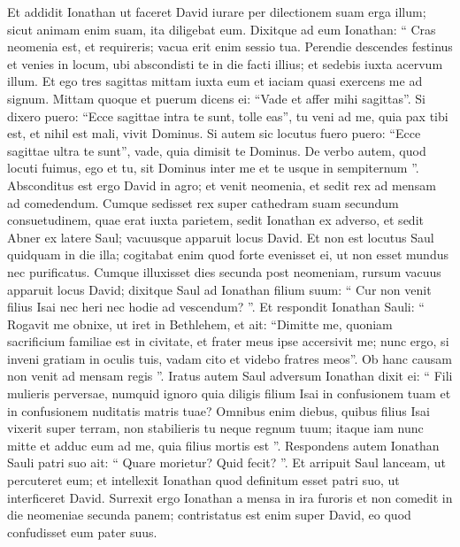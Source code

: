 \begin{biblechapter}
\begin{biblechapter}
\begin{biblechapter}
\begin{biblechapter}
\begin{biblechapter}
\begin{biblechapter}
\begin{biblechapter}
\begin{biblechapter}
\begin{biblechapter}
\begin{biblechapter}
\begin{biblechapter}
\begin{biblechapter}
\begin{biblechapter}
\begin{biblechapter}
\begin{biblechapter}
\begin{biblechapter}
\begin{biblechapter}
\begin{biblechapter}
\begin{biblechapter}
\begin{biblechapter}
\verse Et addidit Ionathan ut faceret David iurare per dilectionem suam erga illum; sicut animam enim suam, ita diligebat eum.
 \verse Dixitque ad eum Ionathan: “ Cras neomenia est, et requireris; 
\verse vacua erit enim sessio tua. Perendie descendes festinus et venies in locum, ubi abscondisti te in die facti illius; et sedebis iuxta acervum illum. 
\verse Et ego tres sagittas mittam iuxta eum et iaciam quasi exercens me ad signum. 
\verse Mittam quoque et puerum dicens ei: “Vade et affer mihi sagittas”. 
\verse Si dixero puero: “Ecce sagittae intra te sunt, tolle eas”, tu veni ad me, quia pax tibi est, et nihil est mali, vivit Dominus. Si autem sic locutus fuero puero: “Ecce sagittae ultra te sunt”, vade, quia dimisit te Dominus. 
\verse De verbo autem, quod locuti fuimus, ego et tu, sit Dominus inter me et te usque in sempiternum ”.
 \verse Absconditus est ergo David in agro; et venit neomenia, et sedit rex ad mensam ad comedendum. 
\verse Cumque sedisset rex super cathedram suam secundum consuetudinem, quae erat iuxta parietem, sedit Ionathan ex adverso, et sedit Abner ex latere Saul; vacuusque apparuit locus David. 
\verse Et non est locutus Saul quidquam in die illa; cogitabat enim quod forte evenisset ei, ut non esset mundus nec purificatus. 
\verse Cumque illuxisset dies secunda post neomeniam, rursum vacuus apparuit locus David; dixitque Saul ad Ionathan filium suum: “ Cur non venit filius Isai nec heri nec hodie ad vescendum? ”. 
\verse Et respondit Ionathan Sauli: “ Rogavit me obnixe, ut iret in Bethlehem, 
\verse et ait: “Dimitte me, quoniam sacrificium familiae est in civitate, et frater meus ipse accersivit me; nunc ergo, si inveni gratiam in oculis tuis, vadam cito et videbo fratres meos”. Ob hanc causam non venit ad mensam regis ”.
 \verse Iratus autem Saul adversum Ionathan dixit ei: “ Fili mulieris perversae, numquid ignoro quia diligis filium Isai in confusionem tuam et in confusionem nuditatis matris tuae? 
\verse Omnibus enim diebus, quibus filius Isai vixerit super terram, non stabilieris tu neque regnum tuum; itaque iam nunc mitte et adduc eum ad me, quia filius mortis est ”. 
\verse Respondens autem Ionathan Sauli patri suo ait: “ Quare morietur? Quid fecit? ”. 
\verse Et arripuit Saul lanceam, ut percuteret eum; et intellexit Ionathan quod definitum esset patri suo, ut interficeret David. 
\verse Surrexit ergo Ionathan a mensa in ira furoris et non comedit in die neomeniae secunda panem; contristatus est enim super David, eo quod confudisset eum pater suus.

\end{biblechapter}
\end{biblechapter}
\end{biblechapter}
\end{biblechapter}
\end{biblechapter}
\end{biblechapter}
\end{biblechapter}
\end{biblechapter}
\end{biblechapter}
\end{biblechapter}
\end{biblechapter}
\end{biblechapter}
\end{biblechapter}
\end{biblechapter}
\end{biblechapter}
\end{biblechapter}
\end{biblechapter}
\end{biblechapter}
\end{biblechapter}
\end{biblechapter}
